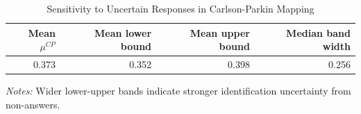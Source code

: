 \begin{table}[!htbp]
\centering
\small
\caption{Sensitivity to Uncertain Responses in Carlson-Parkin Mapping}
\label{tab:cp_bounds}
\begin{threeparttable}

\begin{tabular}{rrrr}
\toprule
Mean $\mu^{CP}$ & Mean lower bound & Mean upper bound & Median band width \\
\midrule
0.373 & 0.352 & 0.398 & 0.256\\
\bottomrule
\end{tabular}
\begin{tablenotes}[flushleft]
\footnotesize
\item \textit{Notes:} Wider lower-upper bands indicate stronger identification uncertainty from non-answers.
\end{tablenotes}
\end{threeparttable}
\end{table}

